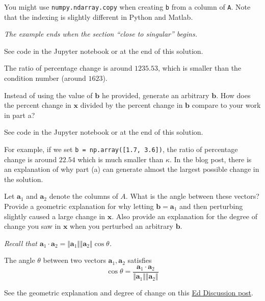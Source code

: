 \documentclass[12pt,letterpaper,answers]{exam}
\newcommand{\vc}[1]{\boldsymbol{#1}}
\begin{document}
\begin{questions}
\begin{parts}
You might use \texttt{numpy.ndarray.copy} when creating \texttt{b} from a column of \texttt{A}.  Note that the indexing is slightly different in Python and Matlab.

\emph{The example ends when the section ``close to singular'' begins.}

\begin{solution}
    See code in the Jupyter notebook or at the end of this solution.

    The ratio of percentage change is around $1235.53$, which is smaller than the condition number (around $1623$).
\end{solution}

\item Instead of using the value of $\vc{b}$ he provided, generate an arbitrary $\vc{b}$.  How does the percent change in $\vc{x}$ divided by the percent change in $\vc{b}$ compare to your work in part a?

\begin{solution}
    See code in the Jupyter notebook or at the end of this solution.

    For example, if we set \texttt{b = np.array([1.7, 3.6])}, the ratio of percentage change is around $22.54$ which is much smaller than $\kappa.$ In the blog post, there is an explanation of why part (a) can generate almost the largest possible change in the solution. 
\end{solution}

\item Let $\vc{a}_1$ and $\vc{a}_2$ denote the columns of $A$.  What is the angle between these vectors?  Provide a geometric explanation for why letting $\vc{b} = \vc{a}_1$ and then perturbing slightly caused a large change in $\vc{x}$.  Also provide an explanation for the degree of change you saw in $\vc{x}$ when you perturbed an arbitrary $\vc{b}$.

\emph{Recall that $\vc{a}_1\cdot\vc{a}_2 = \Vert \vc{a}_1\Vert\Vert\vc{a}_2\Vert\cos\theta$.}

\begin{solution}
    The angle $\theta$ between two vectors $\vc{a}_1, \vc{a}_2$ satisfies
    $$\cos\theta = \dfrac{\vc{a}_1\cdot\vc{a}_2}{\Vert \vc{a}_1\Vert\Vert\vc{a}_2\Vert}$$

    See the geometric explanation and degree of change on this \href{https://edstem.org/us/courses/24695/discussion/1807922}{Ed Discussion post}.
\end{solution}

\end{parts}




\end{questions}
\end{document}
